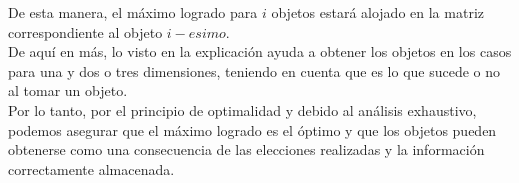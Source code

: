 De esta manera, el máximo logrado para $i$ objetos estará alojado en la matriz correspondiente al objeto $i-esimo$.\\

De aquí en más, lo visto en la explicación ayuda a obtener los objetos en los casos para una y dos o tres dimensiones, teniendo en cuenta que es lo que sucede o no al tomar un objeto. \\

Por lo tanto, por el principio de optimalidad y debido al análisis exhaustivo, podemos asegurar que el máximo logrado es el \'optimo y que los objetos pueden obtenerse como una consecuencia de las elecciones realizadas y la información correctamente almacenada.
